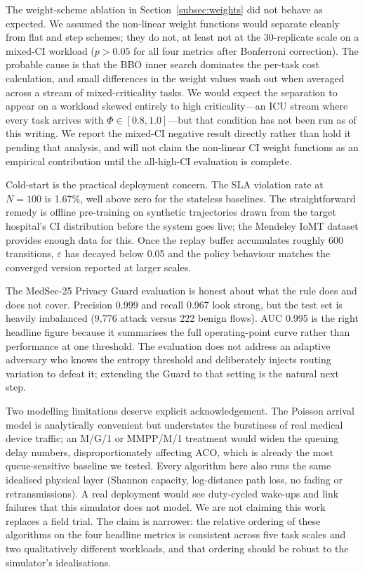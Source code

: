 \documentclass[journal]{IEEEtran}
\begin{document}
The weight-scheme ablation in Section~\ref{subsec:weights} did not
behave as expected. We assumed the non-linear weight functions would
separate cleanly from flat and step schemes; they do not, at least
not at the 30-replicate scale on a mixed-CI workload ($p > 0.05$ for
all four metrics after Bonferroni correction). The probable cause is
that the BBO inner search dominates the per-task cost calculation, and
small differences in the weight values wash out when averaged across a
stream of mixed-criticality tasks. We would expect the separation to
appear on a workload skewed entirely to high criticality---an ICU
stream where every task arrives with $\Phi \in [0.8, 1.0]$---but that
condition has not been run as of this writing. We report the mixed-CI
negative result directly rather than hold it pending that analysis, and
will not claim the non-linear CI weight functions as an empirical
contribution until the all-high-CI evaluation is complete.

Cold-start is the practical deployment concern. The SLA violation rate
at $N = 100$ is 1.67\%, well above zero for the stateless baselines.
The straightforward remedy is offline pre-training on synthetic
trajectories drawn from the target hospital's CI distribution before
the system goes live; the Mendeley IoMT dataset provides enough data
for this. Once the replay buffer accumulates roughly 600 transitions,
$\varepsilon$ has decayed below 0.05 and the policy behaviour matches
the converged version reported at larger scales.

The MedSec-25 Privacy Guard evaluation is honest about what the rule
does and does not cover. Precision 0.999 and recall 0.967 look strong,
but the test set is heavily imbalanced (9{,}776 attack versus 222
benign flows). AUC 0.995 is the right headline figure because it
summarises the full operating-point curve rather than performance at
one threshold. The evaluation does not address an adaptive adversary
who knows the entropy threshold and deliberately injects routing
variation to defeat it; extending the Guard to that setting is the
natural next step.

Two modelling limitations deserve explicit acknowledgement. The Poisson
arrival model is analytically convenient but understates the burstiness
of real medical device traffic; an M/G/1 or MMPP/M/1 treatment would
widen the queuing delay numbers, disproportionately affecting ACO,
which is already the most queue-sensitive baseline we tested. Every
algorithm here also runs the same idealised physical layer (Shannon
capacity, log-distance path loss, no fading or retransmissions). A
real deployment would see duty-cycled wake-ups and link failures that
this simulator does not model. We are not claiming this work replaces a
field trial. The claim is narrower: the relative ordering of these
algorithms on the four headline metrics is consistent across five task
scales and two qualitatively different workloads, and that ordering
should be robust to the simulator's idealisations.
\end{document}
